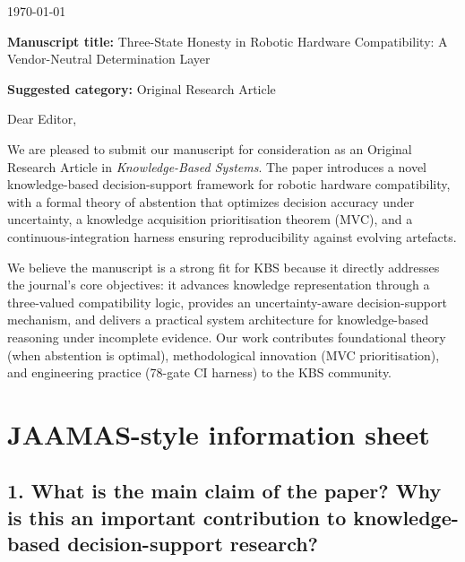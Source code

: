 \documentclass[11pt]{article}
\begin{document}
\begin{flushright}
\today
\end{flushright}

\vspace{1em}

\begin{flushright}
\noindent\textbf{Manuscript title:} Three-State Honesty in Robotic Hardware Compatibility: A Vendor-Neutral Determination Layer

\noindent\textbf{Suggested category:} Original Research Article
\end{flushright}

\vspace{1.5em}

\noindent Dear Editor,

\vspace{1em}

\noindent We are pleased to submit our manuscript for consideration as an Original Research Article in \textit{Knowledge-Based Systems}. The paper introduces a novel knowledge-based decision-support framework for robotic hardware compatibility, with a formal theory of abstention that optimizes decision accuracy under uncertainty, a knowledge acquisition prioritisation theorem (MVC), and a continuous-integration harness ensuring reproducibility against evolving artefacts.

\vspace{1em}

\noindent We believe the manuscript is a strong fit for KBS because it directly addresses the journal's core objectives: it advances knowledge representation through a three-valued compatibility logic, provides an uncertainty-aware decision-support mechanism, and delivers a practical system architecture for knowledge-based reasoning under incomplete evidence. Our work contributes foundational theory (when abstention is optimal), methodological innovation (MVC prioritisation), and engineering practice (78-gate CI harness) to the KBS community.

\vspace{1.5em}

\section*{JAAMAS-style information sheet}

\subsection*{1. What is the main claim of the paper? Why is this an important contribution to knowledge-based decision-support research?}
\end{document}
